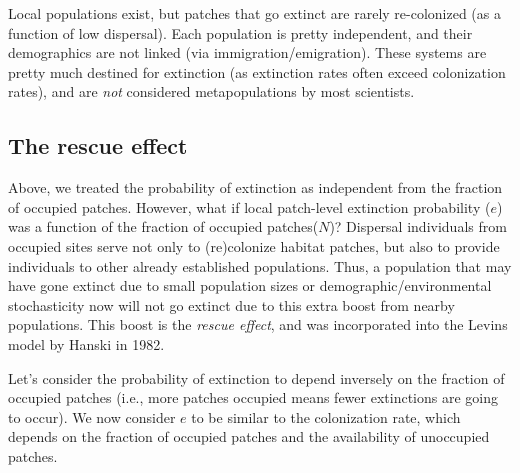 \documentclass[12pt]{article}
\begin{document}
Local populations exist, but patches that go extinct are rarely re-colonized (as a function of low dispersal). Each population is pretty independent, and their demographics are not linked (via immigration/emigration). These systems are pretty much destined for extinction (as extinction rates often exceed colonization rates), and are \textit{not} considered metapopulations by most scientists. 







































\bigskip

\subsection*{The rescue effect}

Above, we treated the probability of extinction as independent from the fraction of occupied patches. However, what if local patch-level extinction probability ($e$) was a function of the fraction of occupied patches($N$)? Dispersal individuals from occupied sites serve not only to (re)colonize habitat patches, but also to provide individuals to other already established populations. Thus, a population that may have gone extinct due to small population sizes or demographic/environmental stochasticity now will not go extinct due to this extra boost from nearby populations. This boost is the \textit{rescue effect}, and was incorporated into the Levins model by Hanski in 1982. 



Let's consider the probability of extinction to depend inversely on the fraction of occupied patches (i.e., more patches occupied means fewer extinctions are going to occur). We now consider $e$ to be similar to the colonization rate, which depends on the fraction of occupied patches and the availability of unoccupied patches. 
\end{document}
